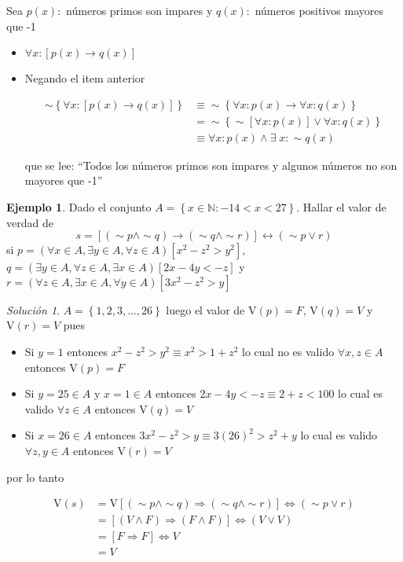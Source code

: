 \documentclass[16pt,]{krantz}
\providecommand{\tightlist}{%
  \setlength{\itemsep}{0pt}\setlength{\parskip}{0pt}}
\theoremstyle{definition}
\theoremstyle{definition}
\newtheorem{example}{Ejemplo}[chapter]
\theoremstyle{definition}
\theoremstyle{definition}
\theoremstyle{remark}
\newtheorem*{solution}{Solución}
\begin{document}
Sea \(p(x):\) números primos son impares y \(q(x):\) números positivos mayores que -1

\begin{itemize}
\item
  \(\forall x:[p(x)\rightarrow q(x)]\)
\item
  Negando el item anterior

  \[
  \begin{aligned}
  \sim\left\{\forall x:[p(x)\rightarrow q(x)]\right\}
  &\equiv \sim\left\{\forall x:p(x)\rightarrow \forall x:q(x)\right\}\\
  &=\sim\left\{\sim[\forall x:p(x)]\vee \forall x:q(x)\right\}\\
  &\equiv\forall x:p(x)\wedge \exists\; x:\sim q(x)
  \end{aligned}
  \]

  que se lee: ``Todos los números primos son impares y algunos números no son mayores que -1''
\end{itemize}

\begin{example}
\protect\hypertarget{exm:wwwwwwwu}{}{\label{exm:wwwwwwwu} }Dado el conjunto \(A=\left\{x\in\mathbb{N}:-14<x<27\right\}\). Hallar el valor de verdad de \[
s=[(\sim p\wedge \sim q)\rightarrow(\sim q\wedge \sim r)]\leftrightarrow(\sim p\vee r) 
\] si \(p=(\forall x\in A, \exists y\in A, \forall z\in A)[x^2-z^2>y^2]\), \(q=(\exists y\in A, \forall z\in A, \exists x \in A)[2x-4y<-z]\) y \(r=(\forall z\in A, \exists x\in A, \forall y \in A)[3x^2-z^2>y]\)
\end{example}

\begin{solution}
\iffalse{} {Solución. } \fi{}\(A=\left\{1,2,3,\ldots,26\right\}\) luego el valor de \(\text{V}(p)=F\), \(\text{V}(q)=V\) y \(\text{V}(r)=V\) pues

\begin{itemize}
\tightlist
\item
  Si \(y=1\) entonces \(x^2-z^2>y^2\equiv x^2>1+z^2\) lo cual no es valido \(\forall x,z\in A\) entonces \(\text{V}(p)=F\)
\item
  Si \(y=25\in A\) y \(x=1\in A\) entonces \(2x-4y<-z\equiv 2+z<100\) lo cual es valido \(\forall z\in A\) entonces \(\text{V}(q)=V\)
\item
  Si \(x=26\in A\) entonces \(3x^2-z^2>y\equiv3(26)^2>z^2+y\) lo cual es valido \(\forall z,y\in A\) entonces \(\text{V}(r)=V\)
\end{itemize}

por lo tanto

\[
\begin{aligned}
\text{V}(s)&=\text{V}[(\sim p\wedge \sim q)\Longrightarrow(\sim q\wedge \sim r)]\Longleftrightarrow(\sim p\vee r)\\
&=[(V\wedge F)\Longrightarrow(F\wedge F)]\Longleftrightarrow(V\vee V)\\
&=[F\Longrightarrow F]\Longleftrightarrow V\\
&=V
\end{aligned}
\]
\end{solution}
\end{document}
